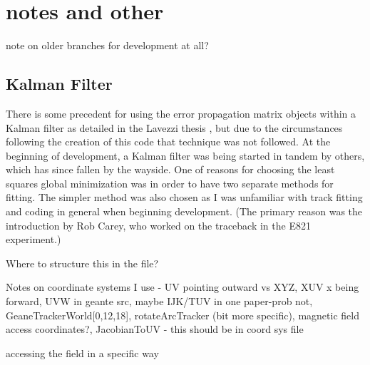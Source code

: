 \section{notes and other}



  note on older branches for development at all?



  \subsection{Kalman Filter}

    There is some precedent for using the error propagation matrix objects within a Kalman filter as detailed in the Lavezzi thesis \cite{Lavezzi}, but due to the circumstances following the creation of this code that technique was not followed. At the beginning of development, a Kalman filter was being started in tandem by others, which has since fallen by the wayside. One of reasons for choosing the least squares global minimization was in order to have two separate methods for fitting. The simpler method was also chosen as I was unfamiliar with track fitting and coding in general when beginning development. (The primary reason was the introduction by Rob Carey, who worked on the traceback in the E821 experiment.)






Where to structure this in the file?

Notes on coordinate systems I use - UV pointing outward vs XYZ, XUV x being forward, UVW in geante src, maybe IJK/TUV in one paper-prob not, GeaneTrackerWorld[0,12,18], rotateArcTracker (bit more specific), magnetic field access coordinates?, JacobianToUV
- this should be in coord sys file

accessing the field in a specific way

